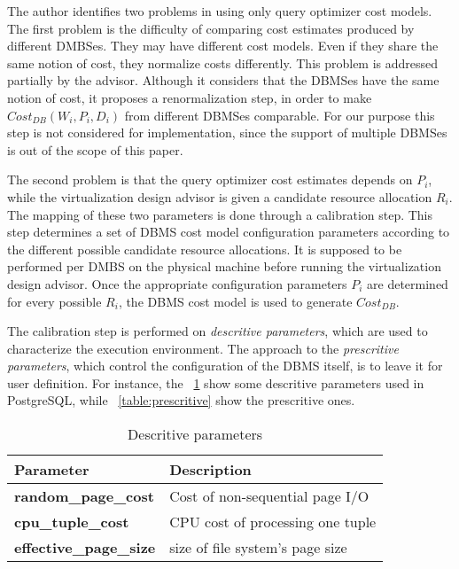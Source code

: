 The author identifies two problems in using only query optimizer cost models. The first problem is the difficulty of comparing cost estimates produced by different DMBSes. They may have different cost models. Even if they share the same notion of cost, they normalize costs differently. This problem is addressed partially by the advisor. Although it considers that the DBMSes have the same notion of cost, it proposes a renormalization step, in order to make $Cost_{DB}(W_{i},P_{i},D_{i})$ from different DBMSes comparable. For our purpose this step is not considered for implementation, since the support of multiple DBMSes is out of the scope of this paper.

The second problem is that the query optimizer cost estimates depends on $P_{i}$, while the virtualization design advisor is given a candidate resource allocation $R_{i}$. The mapping of these two parameters is done through a calibration step. This step determines a set of DBMS cost model configuration parameters according to the different possible candidate resource allocations. It is supposed to be performed per DMBS on the physical machine before running the virtualization design advisor. Once the appropriate configuration parameters $P_{i}$ are determined for every possible $R_{i}$, the DBMS cost model is used to generate $Cost_{DB}$.

The calibration step is performed on  \textit{descritive parameters}, which are used to characterize the execution environment. The approach to the \textit{prescritive parameters}, which control the configuration of the DBMS itself, is to leave it for user definition. For instance, the ~\ref{table:descritive}  show some descritive parameters used in PostgreSQL, while ~\ref{table:prescritive}  show the prescritive ones. 


\begin{table}[ht]
    \centering
    \begin{tabular}{ | l | p{5cm} |}
    \hline
    Parameter & Description  \\ \hline
    \textbf{random\_page\_cost} & Cost of non-sequential page I/O \\ \hline
    \textbf{cpu\_tuple\_cost} & CPU cost of processing one tuple \\ \hline
    \textbf{effective\_page\_size} & size of file system's page size  \\
    \hline
    \end{tabular}
    \caption{Descritive parameters}
    \label{table:descritive}
\end{table}


